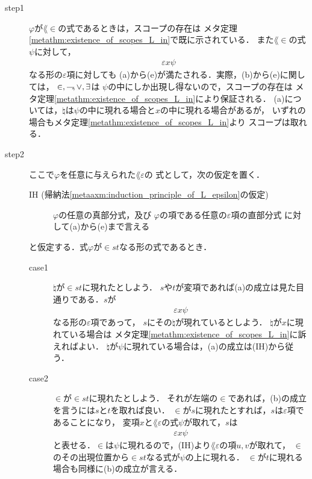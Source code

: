 	\begin{metaprf}\mbox{}
		\begin{description}
			\item[step1]
				$\varphi$が$\lang{\in}$の式であるときは，スコープの存在は
				メタ定理\ref{metathm:existence_of_scopes_L_in}で既に示されている．
				また$\lang{\in}$の式$\psi$に対して，
				\begin{align}
					\varepsilon x \psi
				\end{align}
				なる形の$\varepsilon$項に対しても
				(a)から(e)が満たされる．実際，(b)から(e)に関しては，
				$\in,\rightharpoondown\hspace{-0.25em},\vee,\exists$は
				$\psi$の中にしか出現し得ないので，スコープの存在は
				メタ定理\ref{metathm:existence_of_scopes_L_in}により保証される．
				(a)については，$\natural$は$\psi$の中に現れる場合と$x$の中に現れる場合があるが，
				いずれの場合もメタ定理\ref{metathm:existence_of_scopes_L_in}より
				スコープは取れる．
			
				
			\item[step2] ここで$\varphi$を任意に与えられた$\lang{\varepsilon}$の
				式として，次の仮定を置く．
				\begin{description}
					\item[IH (帰納法\ref{metaaxm:induction_principle_of_L_epsilon}の仮定)]
					$\varphi$の任意の真部分式，及び
					$\varphi$の項である任意の$\varepsilon$項の直部分式
					に対して(a)から(e)まで言える
				\end{description}
				
				と仮定する．式$\varphi$が$\in s t$なる形の式であるとき．
				\begin{description}
					\item[case1]
						$\natural$が$\in s t$に現れたとしよう．
						$s$や$t$が変項であれば(a)の成立は見た目通りである．$s$が
						\begin{align}
							\varepsilon x \psi
						\end{align}
						なる形の$\varepsilon$項であって，
						$s$にその$\natural$が現れているとしよう．
						$\natural$が$x$に現れている場合は
						メタ定理\ref{metathm:existence_of_scopes_L_in}に訴えればよい．
						$\natural$が$\psi$に現れている場合は，(a)の成立は(IH)から従う．
						
					\item[case2]
						$\in$が$\in s t$に現れたとしよう．
						それが左端の$\in$であれば，(b)の成立を言うには$s$と$t$を取れば良い．
						$\in$が$s$に現れたとすれば，$s$は$\varepsilon$項であることになり，
						変項$x$と$\lang{\varepsilon}$の式$\psi$が取れて，$s$は
						\begin{align}
							\varepsilon x \psi
						\end{align}
						と表せる．$\in$は$\psi$に現れるので，(IH)より$\lang{\varepsilon}$の項$u,v$が取れて，
						$\in$のその出現位置から$\in s t$なる式が$\psi$の上に現れる．
						$\in$が$t$に現れる場合も同様に(b)の成立が言える．
				

\end{description}
\end{description}
\end{metaprf}
